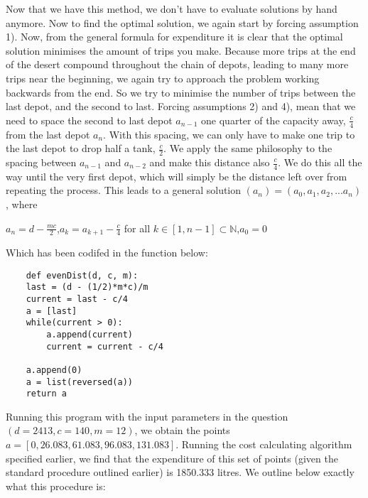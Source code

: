 \documentclass{homework}
\newcommand*{\N}{\mathbb N}
\begin{document}
Now that we have this method, we don't have to evaluate solutions by hand anymore.
\newline\newline
Now to find the optimal solution, we again start by forcing assumption 1). Now, from the general formula for expenditure it is clear that the optimal solution minimises the amount of trips you make. Because more trips at the end of the desert compound throughout the chain of depots, leading to many more trips near the beginning, we again try to approach the problem working backwards from the end. So we try to minimise the number of trips between the last depot, and the second to last. Forcing assumptions 2) and 4), mean that we need to space the second to last depot $a_{n-1}$ one quarter of the capacity away, $\frac{c}{4}$ from the last depot $a_n$. With this spacing, we can only have to make one trip to the last depot to drop half a tank, $\frac{c}{2}$. We apply the same philosophy to the spacing between $a_{n-1}$ and $a_{n-2}$ and make this distance also $\frac{c}{4}$. We do this all the way until the very first depot, which will simply be the distance left over from repeating the process.
\newline\newline
This leads to a general solution $(a_n) = (a_0, a_1, a_2, ... a_n)$, where
\newline\begin{center}
$a_n = d - \frac{mc}{2}$,\quad$a_{k} = a_{k+1} - \frac{c}{4}$ for all $k \in [1, n-1] \subset \N$,\quad$a_0 = 0$
\end{center}
Which has been codifed in the function below:
\begin{lstlisting}
    def evenDist(d, c, m):
    last = (d - (1/2)*m*c)/m
    current = last - c/4
    a = [last]
    while(current > 0):
        a.append(current)
        current = current - c/4

    a.append(0)
    a = list(reversed(a))
    return a

\end{lstlisting}
Running this program with the input parameters in the question $(d=2413, c=140, m=12)$, we obtain the points $a = [0, 26.083, 61.083, 96.083, 131.083]$. Running the cost calculating algorithm specified earlier, we find that the expenditure of this set of points (given the standard procedure outlined earlier) is 1850.333 litres. We outline below exactly what this procedure is:
\newline
\end{document}

